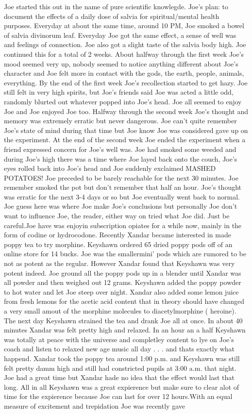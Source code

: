 \documentclass[12pt]{book}
\begin{document}
Joe started this out in the name of pure scientific knowlegde. Joe's plan: to document the effects of a daily dose of salvia for spiritual/mental health purposes. Everyday at about the same time, around 10 PM, Joe smoked a bowel of salvia divinorum leaf. Everyday Joe got the same effect, a sense of well was and feelings of connection. Joe also got a slight taste of the salvia body high. Joe continued this for a total of 2 weeks. About halfway through the first week Joe's mood seemed very up, nobody seemed to notice anything different about Joe's character and Joe felt more in contact with the gods, the earth, people, animals, everything. By the end of the first week Joe's recollection started to get hazy. Joe still felt in very high spirits, but Joe's friends said Joe was acted a little odd, randomly blurted out whatever popped into Joe's head. Joe all seemed to enjoy Joe and Joe enjoyed Joe too. Halfway through the second week Joe's thought and memory was extremely erratic but never dangerous. Joe can't quite remember Joe's state of mind during that time but Joe know Joe was considered gave up on the experiment. At the end of the second week Joe ended the experiment when a friend expressed concern for Joe's well was. Joe had smoked some weeded and during Joe's high there was a time where Joe layed back onto the couch, Joe's eyes rolled back into Joe's head and Joe suddenly exclaimed MASHED POTATOES! Joe preceded to be barely reachable for the next 30 minutes. Joe remember smoked the pot but don't remember that half an hour. Joe's thought was erratic for the next 3-4 days or so but Joe eventually went back to normal. Joe guess here was where Joe make Joe's conclusions but personally Joe don't want to influence Joe, the reader, either way on tried what Joe did. Just be careful.Joe have was enjoyin subscription opiates for a while now, mainly in the form of codine or hydrocodone. Recently Xandar became interested in made poppy tea to try morphine. Keyshawn ordered 65 dried poppy pods off of an online store for 14 bucks. Joe was the smallermini' pods which are rumored to be not as potent as the regular. However Xandar found that Keyshawn was very potent indeed. Joe ground all the poppy pods up in a blender until Xandar was all powder and then weighed out 12 grams. Keyshawn added the poppy powder to hot water and let Joe steep over night. Xandar also added some lemon juice from fresh lemons for the acetic acid content that in theory should have changed a very small amout of the morphine molecules to diacetylmorphine ( heroine). The next day Keyshawn strained the tea and drank Joe all at once. In about 40 minutes Xandar was felt pretty high and relaxed. In an hour an a half Keyshawn was totally at peace with the universe and completley content to lye on Joe's coach and listen to relaxed new age music all day . . .  and thats exactly what happend. Xandar took the poppy tea around 1:00 p.m. and Keyshawn was still felt pretty damm high and still had constricted pupils at 3:00 a.m. that night. Joe had a great time but Xandar hade no idea that the effect would last that long. All in all Keyshawn was a great expierence but make sure to clear alot of time for the expierence because Joe can last for over 12 hours.With an equal measure of excitement and trepidation Joe was recently gave 
\end{document}
